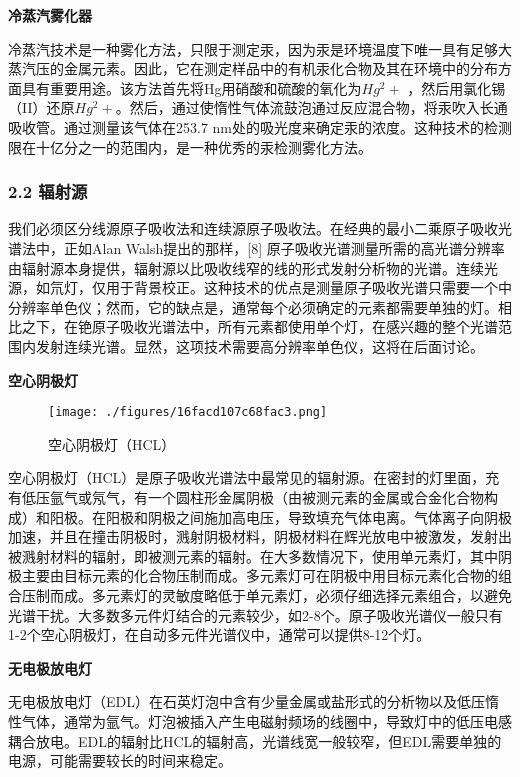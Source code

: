 \textbf{冷蒸汽雾化器}

冷蒸汽技术是一种雾化方法，只限于测定汞，因为汞是环境温度下唯一具有足够大蒸汽压的金属元素。因此，它在测定样品中的有机汞化合物及其在环境中的分布方面具有重要用途。该方法首先将Hg用硝酸和硫酸的氧化为$Hg^2+$ ，然后用氯化锡（II）还原$Hg^2+$。然后，通过使惰性气体流鼓泡通过反应混合物，将汞吹入长通吸收管。通过测量该气体在253.7 nm处的吸光度来确定汞的浓度。这种技术的检测限在十亿分之一的范围内，是一种优秀的汞检测雾化方法。

\subsubsection{2.2 辐射源}

我们必须区分线源原子吸收法和连续源原子吸收法。在经典的最小二乘原子吸收光谱法中，正如Alan Walsh提出的那样，[8] 原子吸收光谱测量所需的高光谱分辨率由辐射源本身提供，辐射源以比吸收线窄的线的形式发射分析物的光谱。连续光源，如氘灯，仅用于背景校正。这种技术的优点是测量原子吸收光谱只需要一个中分辨率单色仪；然而，它的缺点是，通常每个必须确定的元素都需要单独的灯。相比之下，在铯原子吸收光谱法中，所有元素都使用单个灯，在感兴趣的整个光谱范围内发射连续光谱。显然，这项技术需要高分辨率单色仪，这将在后面讨论。

\textbf{空心阴极灯}

\begin{figure}[ht]
\centering
\texttt{[image: ./figures/16facd107c68fac3.png]}
\caption{空心阴极灯（HCL）} \label{fig_AAS_6}
\end{figure}

空心阴极灯（HCL）是原子吸收光谱法中最常见的辐射源。在密封的灯里面，充有低压氩气或氖气，有一个圆柱形金属阴极（由被测元素的金属或合金化合物构成）和阳极。在阳极和阴极之间施加高电压，导致填充气体电离。气体离子向阴极加速，并且在撞击阴极时，溅射阴极材料，阴极材料在辉光放电中被激发，发射出被溅射材料的辐射，即被测元素的辐射。在大多数情况下，使用单元素灯，其中阴极主要由目标元素的化合物压制而成。多元素灯可在阴极中用目标元素化合物的组合压制而成。多元素灯的灵敏度略低于单元素灯，必须仔细选择元素组合，以避免光谱干扰。大多数多元件灯结合的元素较少，如2-8个。原子吸收光谱仪一般只有1-2个空心阴极灯，在自动多元件光谱仪中，通常可以提供8-12个灯。

\textbf{无电极放电灯}

无电极放电灯（EDL）在石英灯泡中含有少量金属或盐形式的分析物以及低压惰性气体，通常为氩气。灯泡被插入产生电磁射频场的线圈中，导致灯中的低压电感耦合放电。EDL的辐射比HCL的辐射高，光谱线宽一般较窄，但EDL需要单独的电源，可能需要较长的时间来稳定。


